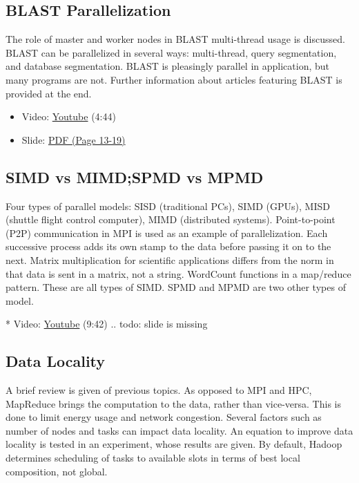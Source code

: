 \subsection{BLAST Parallelization}\label{blast-parallelization}

The role of master and worker nodes in BLAST multi-thread usage is
discussed. BLAST can be parallelized in several ways: multi-thread,
query segmentation, and database segmentation. BLAST is pleasingly
parallel in application, but many programs are not. Further information
about articles featuring BLAST is provided at the end.

\begin{itemize}
\tightlist
\item
  Video: \href{https://www.youtube.com/watch?v=isc0MjkwTlk}{Youtube}
  (4:44)
\item
  Slide:
  \href{https://drive.google.com/open?id=0B88HKpainTSfdnFvY1V3dlFTRlE}{PDF
  (Page 13-19)}
\end{itemize}

\subsection{SIMD vs MIMD;SPMD vs MPMD}\label{simd-vs-mimdspmd-vs-mpmd}

Four types of parallel models: SISD (traditional PCs), SIMD (GPUs), MISD
(shuttle flight control computer), MIMD (distributed systems).
Point-to-point (P2P) communication in MPI is used as an example of
parallelization. Each successive process adds its own stamp to the data
before passing it on to the next. Matrix multiplication for scientific
applications differs from the norm in that data is sent in a matrix, not
a string. WordCount functions in a map/reduce pattern. These are all
types of SIMD. SPMD and MPMD are two other types of model.

* Video: \href{https://www.youtube.com/watch?v=zHQiR56Zmtc}{Youtube}
(9:42) .. todo: slide is missing

\subsection{Data Locality}\label{data-locality}

A brief review is given of previous topics. As opposed to MPI and HPC,
MapReduce brings the computation to the data, rather than vice-versa.
This is done to limit energy usage and network congestion. Several
factors such as number of nodes and tasks can impact data locality. An
equation to improve data locality is tested in an experiment, whose
results are given. By default, Hadoop determines scheduling of tasks to
available slots in terms of best local composition, not global.

